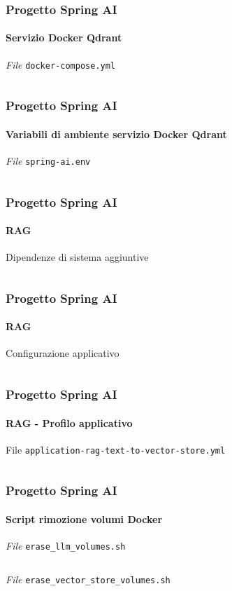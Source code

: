 %
\begin{frame}[t,fragile] \frametitle{Progetto Spring AI}
    \framesubtitle{Servizio Docker Qdrant}
        \begin{block}{\textit{File} \texttt{docker-compose.yml}}
			{\tiny\inputminted{yaml}{code/docker-compose.yml}}
    	\end{block}
\end{frame}
%
\begin{frame}[t,fragile] \frametitle{Progetto Spring AI}
    \framesubtitle{Variabili di ambiente servizio Docker Qdrant}
        \begin{block}{\textit{File} \texttt{spring-ai.env}}
			{\tiny\inputminted{text}{code/spring-ai.env}}
    	\end{block}
\end{frame}
%
\begin{frame}[t,fragile] \frametitle{Progetto Spring AI}
    \framesubtitle{RAG}
        \begin{block}{Dipendenze di sistema aggiuntive}
			{\tiny\inputminted{xml}{code/pom.xml}}
    	\end{block}
\end{frame}
%
\begin{frame}[t,fragile] \frametitle{Progetto Spring AI}
    \framesubtitle{RAG}
        \begin{block}{Configurazione applicativo}
			{\tiny\inputminted{yaml}{code/application.yml}}
    	\end{block}
\end{frame}
%
\begin{frame}[t,fragile] \frametitle{Progetto Spring AI}
    \framesubtitle{RAG - Profilo applicativo}
        \begin{block}{File \texttt{application-rag-text-to-vector-store.yml}}
			{\tiny\inputminted{yaml}{code/application-rag-text-to-vector-store.yml}}
    	\end{block}
\end{frame}
%
\begin{frame}[t,fragile] \frametitle{Progetto Spring AI}
    \framesubtitle{Script rimozione volumi Docker}
        \begin{block}{\textit{File} \texttt{erase\_llm\_volumes.sh}}
			{\tiny\inputminted{bash}{code/erase_llm_volumes.sh}}
    	\end{block}
        \begin{block}{\textit{File} \texttt{erase\_vector\_store\_volumes.sh}}
			{\tiny\inputminted{bash}{code/erase_vector_store_volumes.sh}}
    	\end{block}
\end{frame}
